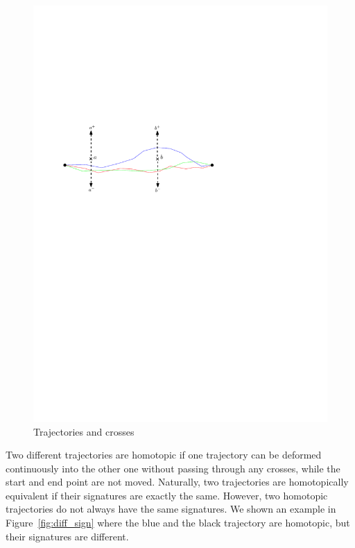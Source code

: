 \begin{figure}
\centering
\includegraphics[scale=1]{Gambar/base_sign}
\caption[Trajectories and crosses]{Trajectories and crosses} 
\label{fig:base_sign}
\end{figure}


Two different trajectories are homotopic if one trajectory can be deformed continuously into the other one without passing through any crosses, while the start and end point are not moved.
Naturally, two trajectories are homotopically equivalent if their signatures are exactly the same. 
However, two homotopic trajectories do not always have the same signatures.
We shown an example in Figure~\ref{fig:diff_sign} where the blue and the black trajectory are homotopic, but their signatures are different.

